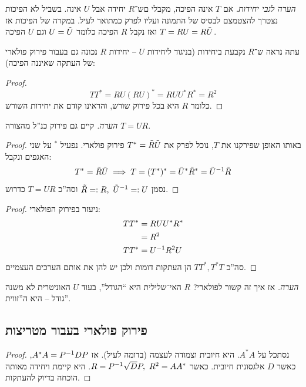 \documentclass[]{../../../../tex/classes/styledArticle}
\begin{document}
	\textit{הערה לגבי יחידות. }אם $T$ אינה הפיכה, מקבלי םש־$R$ יחידה אבל $U$ אינה. בשביל לא הפיכות נצטרך להצטמצם לבסיס של התמונה ועליו לפרק כמתואר לעיל. במקרה של הפיכות אז $T = RU = R \tilde U$ ואז נקבל $R$ הפיכה כלומר $U = \tilde U$ וגם $U$ הפיכה. 
	
	עתה נראה ש־$R$ נקבעת ביחידות (בניגוד ליחידות $U$ – יחידות $R$ נכונה גם בעבור פירוק פולארי של העתקה שאיננה הפיכה): 
	\begin{proof}
		\[ TT^* = RU(RU)^* = RUU^*R^* = R^2 \]
		כלומר $R$ היא בכל פירוק שורש, והראינו קודם את יחידות השורש. 
	\end{proof}
	\textit{הערה. }קיים גם פירוק כנ''ל מהצורה $T = UR$. 
	\begin{proof}
		באותו האופן שפירקנו את $T$, נוכל לפרק את $T^* = \tilde R \tilde U$ פירוק פולארי. נפעיל $^*$ על שני האגפים ונקבל: 
		\[ T^* =\tilde R \tilde U \implies T = (T^*)^* = \tilde U^*\tilde R^* = \tilde U^{-1} \tilde R \]
		נסמן $\tilde R =: R, \ \tilde U^{-1} =: U$ וסה''כ $T = UR$ כדרוש. 
	\end{proof}
	\begin{proof}ניעזר בפירוק הפולארי: 
		\begin{align*}
			TT^* &= RUU^*R^* \\
			&= R^2 \\
			TT^* &= U^{-1} R^2U
		\end{align*}
		סה''כ $TT^*, T^*T$ הן העתקות דומות ולכן יש להן את אותם הערכים העצמיים. 
	\end{proof}
	
	\textit{הערה. }אז איך זה קשור לפולארי? $R$ האי־שלילית היא ``הגודל'', בעוד $U$ האוניטרית לא משנה גודל – היא ה''זווית''. 
	
	
	\subsection{פירוק פולארי בעבור מטריצות}
	\begin{proof}
		נסתכל על $A^*A$. היא חיובית וצמודה לעצמה (בדומה לעיל). אז $A^*A = P^{-1} D P$, כאשר $D$ אלגסונית חיובית. כאשר $R = P\op \sqrt D P, \ R^2 = AA^*$. היא קיימת ויחידה מאותה הוכחה בדיוק להעתקות. 
	\end{proof}
	
\end{document}
